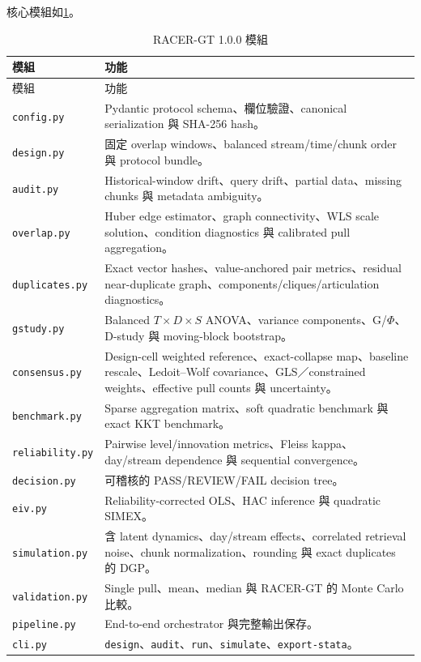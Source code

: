 \documentclass[12pt,a4paper,oneside]{article}
\begin{document}
核心模組如\cref{tab:modules}。

\begin{longtable}{p{3.5cm}p{10.5cm}}
\caption{RACER-GT 1.0.0 模組}\label{tab:modules}\\
\toprule
模組 & 功能\\
\midrule
\endfirsthead
\toprule
模組 & 功能\\
\midrule
\endhead
\texttt{config.py} & Pydantic protocol schema、欄位驗證、canonical serialization 與 SHA-256 hash。\\
\texttt{design.py} & 固定 overlap windows、balanced stream/time/chunk order 與 protocol bundle。\\
\texttt{audit.py} & Historical-window drift、query drift、partial data、missing chunks 與 metadata ambiguity。\\
\texttt{overlap.py} & Huber edge estimator、graph connectivity、WLS scale solution、condition diagnostics 與 calibrated pull aggregation。\\
\texttt{duplicates.py} & Exact vector hashes、value-anchored pair metrics、residual near-duplicate graph、components/cliques/articulation diagnostics。\\
\texttt{gstudy.py} & Balanced $T\times D\times S$ ANOVA、variance components、G/$\Phi$、D-study 與 moving-block bootstrap。\\
\texttt{consensus.py} & Design-cell weighted reference、exact-collapse map、baseline rescale、Ledoit--Wolf covariance、GLS／constrained weights、effective pull counts 與 uncertainty。\\
\texttt{benchmark.py} & Sparse aggregation matrix、soft quadratic benchmark 與 exact KKT benchmark。\\
\texttt{reliability.py} & Pairwise level/innovation metrics、Fleiss kappa、day/stream dependence 與 sequential convergence。\\
\texttt{decision.py} & 可稽核的 PASS/REVIEW/FAIL decision tree。\\
\texttt{eiv.py} & Reliability-corrected OLS、HAC inference 與 quadratic SIMEX。\\
\texttt{simulation.py} & 含 latent dynamics、day/stream effects、correlated retrieval noise、chunk normalization、rounding 與 exact duplicates 的 DGP。\\
\texttt{validation.py} & Single pull、mean、median 與 RACER-GT 的 Monte Carlo 比較。\\
\texttt{pipeline.py} & End-to-end orchestrator 與完整輸出保存。\\
\texttt{cli.py} & \texttt{design}、\texttt{audit}、\texttt{run}、\texttt{simulate}、\texttt{export-stata}。\\
\bottomrule
\end{longtable}
\end{document}
